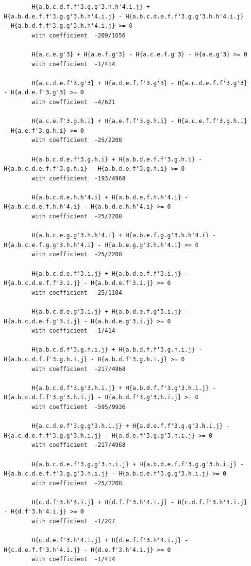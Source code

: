 \documentclass[11pt, a4paper]{kybernetika}
\begin{document}
\begin{verbatim}
		H{a.b.c.d.f.f'3.g.g'3.h.h'4.i.j} + H{a.b.d.e.f.f'3.g.g'3.h.h'4.i.j} - H{a.b.c.d.e.f.f'3.g.g'3.h.h'4.i.j} - H{a.b.d.f.f'3.g.g'3.h.h'4.i.j} >= 0
		with coefficient  -209/1656
		
		H{a.c.e.g'3} + H{a.e.f.g'3} - H{a.c.e.f.g'3} - H{a.e.g'3} >= 0
		with coefficient  -1/414
		
		H{a.c.d.e.f'3.g'3} + H{a.d.e.f.f'3.g'3} - H{a.c.d.e.f.f'3.g'3} - H{a.d.e.f'3.g'3} >= 0
		with coefficient  -4/621
		
		H{a.c.e.f'3.g.h.i} + H{a.e.f.f'3.g.h.i} - H{a.c.e.f.f'3.g.h.i} - H{a.e.f'3.g.h.i} >= 0
		with coefficient  -25/2208
		
		H{a.b.c.d.e.f'3.g.h.i} + H{a.b.d.e.f.f'3.g.h.i} - H{a.b.c.d.e.f.f'3.g.h.i} - H{a.b.d.e.f'3.g.h.i} >= 0
		with coefficient  -193/4968
		
		H{a.b.c.d.e.h.h'4.i} + H{a.b.d.e.f.h.h'4.i} - H{a.b.c.d.e.f.h.h'4.i} - H{a.b.d.e.h.h'4.i} >= 0
		with coefficient  -25/2208
		
		H{a.b.c.e.g.g'3.h.h'4.i} + H{a.b.e.f.g.g'3.h.h'4.i} - H{a.b.c.e.f.g.g'3.h.h'4.i} - H{a.b.e.g.g'3.h.h'4.i} >= 0
		with coefficient  -25/2208
		
		H{a.b.c.d.e.f'3.i.j} + H{a.b.d.e.f.f'3.i.j} - H{a.b.c.d.e.f.f'3.i.j} - H{a.b.d.e.f'3.i.j} >= 0
		with coefficient  -25/1104
		
		H{a.b.c.d.e.g'3.i.j} + H{a.b.d.e.f.g'3.i.j} - H{a.b.c.d.e.f.g'3.i.j} - H{a.b.d.e.g'3.i.j} >= 0
		with coefficient  -1/414
		
		H{a.b.c.d.f'3.g.h.i.j} + H{a.b.d.f.f'3.g.h.i.j} - H{a.b.c.d.f.f'3.g.h.i.j} - H{a.b.d.f'3.g.h.i.j} >= 0
		with coefficient  -217/4968
		
		H{a.b.c.d.f'3.g'3.h.i.j} + H{a.b.d.f.f'3.g'3.h.i.j} - H{a.b.c.d.f.f'3.g'3.h.i.j} - H{a.b.d.f'3.g'3.h.i.j} >= 0
		with coefficient  -595/9936
		
		H{a.c.d.e.f'3.g.g'3.h.i.j} + H{a.d.e.f.f'3.g.g'3.h.i.j} - H{a.c.d.e.f.f'3.g.g'3.h.i.j} - H{a.d.e.f'3.g.g'3.h.i.j} >= 0
		with coefficient  -217/4968
		
		H{a.b.c.d.e.f'3.g.g'3.h.i.j} + H{a.b.d.e.f.f'3.g.g'3.h.i.j} - H{a.b.c.d.e.f.f'3.g.g'3.h.i.j} - H{a.b.d.e.f'3.g.g'3.h.i.j} >= 0
		with coefficient  -25/2208
		
		H{c.d.f'3.h'4.i.j} + H{d.f.f'3.h'4.i.j} - H{c.d.f.f'3.h'4.i.j} - H{d.f'3.h'4.i.j} >= 0
		with coefficient  -1/207
		
		H{c.d.e.f'3.h'4.i.j} + H{d.e.f.f'3.h'4.i.j} - H{c.d.e.f.f'3.h'4.i.j} - H{d.e.f'3.h'4.i.j} >= 0
		with coefficient  -1/414
		

\end{verbatim}
\end{document}
